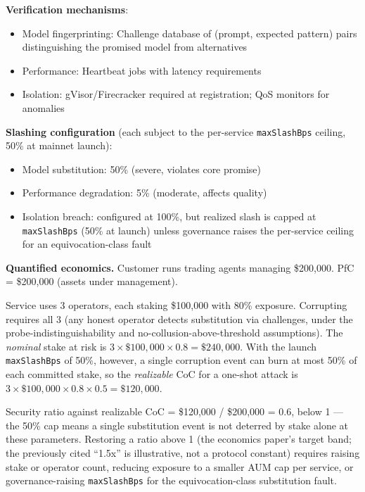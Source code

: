 \documentclass[11pt,a4paper]{article}
\begin{document}
\textbf{Verification mechanisms}:
\begin{itemize}[noitemsep]
    \item Model fingerprinting: Challenge database of (prompt, expected pattern) pairs distinguishing the promised model from alternatives
    \item Performance: Heartbeat jobs with latency requirements
    \item Isolation: gVisor/Firecracker required at registration; QoS monitors for anomalies
\end{itemize}

\textbf{Slashing configuration} (each subject to the per-service \texttt{maxSlashBps} ceiling, 50\% at mainnet launch):
\begin{itemize}[noitemsep]
    \item Model substitution: 50\% (severe, violates core promise)
    \item Performance degradation: 5\% (moderate, affects quality)
    \item Isolation breach: configured at 100\%, but realized slash is capped at \texttt{maxSlashBps} (50\% at launch) unless governance raises the per-service ceiling for an equivocation-class fault
\end{itemize}

\textbf{Quantified economics.} Customer runs trading agents managing \$200,000. PfC = \$200,000 (assets under management).

Service uses 3 operators, each staking \$100,000 with 80\% exposure. Corrupting requires all 3 (any honest operator detects substitution via challenges, under the probe-indistinguishability and no-collusion-above-threshold assumptions). The \emph{nominal} stake at risk is $3 \times \$100,000 \times 0.8 = \$240,000$. With the launch \texttt{maxSlashBps} of 50\%, however, a single corruption event can burn at most 50\% of each committed stake, so the \emph{realizable} CoC for a one-shot attack is $3 \times \$100,000 \times 0.8 \times 0.5 = \$120,000$.

Security ratio against realizable CoC = \$120,000 / \$200,000 = 0.6, below 1 --- the 50\% cap means a single substitution event is not deterred by stake alone at these parameters. Restoring a ratio above 1 (the economics paper's target band; the previously cited ``1.5x'' is illustrative, not a protocol constant) requires raising stake or operator count, reducing exposure to a smaller AUM cap per service, or governance-raising \texttt{maxSlashBps} for the equivocation-class substitution fault.
\end{document}
